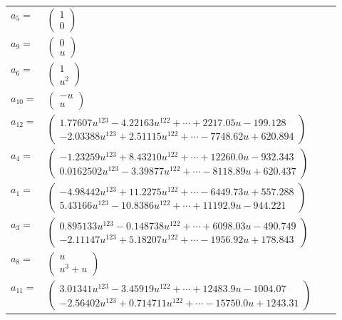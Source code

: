 \documentclass[1p]{elsarticle_modified}
\theoremstyle{definition}
\begin{document}
\begin{tabular}{m{7pt} m{180pt} m{7pt} m{180pt} }
\flushright $a_{5}=$&$\begin{pmatrix}1\\0\end{pmatrix}$ \\
\flushright $a_{9}=$&$\begin{pmatrix}0\\u\end{pmatrix}$ \\
\flushright $a_{6}=$&$\begin{pmatrix}1\\u^2\end{pmatrix}$ \\
\flushright $a_{10}=$&$\begin{pmatrix}- u\\u\end{pmatrix}$ \\
\flushright $a_{12}=$&$\begin{pmatrix}1.77607 u^{123}-4.22163 u^{122}+\cdots+2217.05 u-199.128\\-2.03388 u^{123}+2.51115 u^{122}+\cdots-7748.62 u+620.894\end{pmatrix}$ \\
\flushright $a_{4}=$&$\begin{pmatrix}-1.23259 u^{123}+8.43210 u^{122}+\cdots+12260.0 u-932.343\\0.0162502 u^{123}-3.39877 u^{122}+\cdots-8118.89 u+620.437\end{pmatrix}$ \\
\flushright $a_{1}=$&$\begin{pmatrix}-4.98442 u^{123}+11.2275 u^{122}+\cdots-6449.73 u+557.288\\5.43166 u^{123}-10.8386 u^{122}+\cdots+11192.9 u-944.221\end{pmatrix}$ \\
\flushright $a_{3}=$&$\begin{pmatrix}0.895133 u^{123}-0.148738 u^{122}+\cdots+6098.03 u-490.749\\-2.11147 u^{123}+5.18207 u^{122}+\cdots-1956.92 u+178.843\end{pmatrix}$ \\
\flushright $a_{8}=$&$\begin{pmatrix}u\\u^3+u\end{pmatrix}$ \\
\flushright $a_{11}=$&$\begin{pmatrix}3.01341 u^{123}-3.45919 u^{122}+\cdots+12483.9 u-1004.07\\-2.56402 u^{123}+0.714711 u^{122}+\cdots-15750.0 u+1243.31\end{pmatrix}$ \\

\end{tabular}
\end{document}
